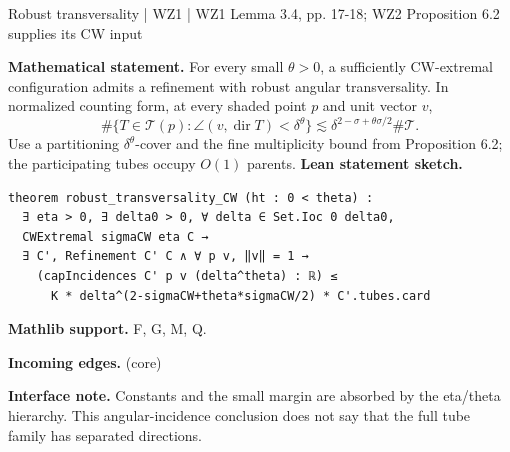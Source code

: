 \documentclass[10pt,a4paper]{article}
\newcommand{\nodecard}[1]{\hyperlink{node-#1}{\texttt{\detokenize{#1}}}}
\begin{document}
\begin{minipage}{\linewidth}
\hypertarget{node-L3_4}{}
\begin{tcolorbox}[colback=white,colframe=setupfg,colbacktitle=setupbg,coltitle=ink,boxrule=0.45pt,arc=1.6mm,left=3mm,right=3mm,top=2mm,bottom=2mm,title={\sffamily\bfseries WZ1 Lemma 3.4 / CW \hfill \texttt{L3\_4}}]
{\sffamily\small\color{muted}Robust transversality | WZ1 | WZ1 Lemma 3.4, pp. 17-18; WZ2 Proposition 6.2 supplies its CW input}\par
\textbf{Mathematical statement.} For every small $\theta>0$, a sufficiently CW-extremal configuration admits a refinement with robust angular transversality.
In normalized counting form, at every shaded point $p$ and unit vector $v$,
\[\#\{T\in\mathcal T(p):\angle(v,\operatorname{dir}T)<\delta^\theta\}
\lesssim\delta^{2-\sigma+\theta\sigma/2}\#\mathcal T.\]
Use a partitioning $\delta^\theta$-cover and the fine multiplicity bound from Proposition 6.2; the participating tubes occupy $O(1)$ parents.
\smallskip\textbf{Lean statement sketch.}
\begin{Verbatim}[fontsize=\small,breaklines=true,breakanywhere=true,tabsize=2]
theorem robust_transversality_CW (ht : 0 < theta) :
  ∃ eta > 0, ∃ delta0 > 0, ∀ delta ∈ Set.Ioc 0 delta0,
  CWExtremal sigmaCW eta C →
  ∃ C', Refinement C' C ∧ ∀ p v, ‖v‖ = 1 →
    (capIncidences C' p v (delta^theta) : ℝ) ≤
      K * delta^(2-sigmaCW+theta*sigmaCW/2) * C'.tubes.card
\end{Verbatim}
{\footnotesize\textbf{Mathlib support.} F, G, M, Q.\par
\textbf{Incoming edges.} \nodecard{W2P6_2} (core)\par}
{\footnotesize\textbf{Interface note.} Constants and the small margin are absorbed by the eta/theta hierarchy. This angular-incidence conclusion does not say that the full tube family has separated directions.}
\end{tcolorbox}\end{minipage}\par\medskip
\end{document}
